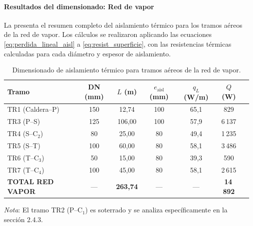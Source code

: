 \paragraph{Resultados del dimensionado: Red de vapor}
\label{par:resultados_vapor_aereo}

La  presenta el resumen completo del aislamiento térmico para los tramos aéreos de la red de vapor. Los cálculos se realizaron aplicando las ecuaciones \eqref{eq:perdida_lineal_aisl} a \eqref{eq:resist_superficie}, con las resistencias térmicas calculadas para cada diámetro y espesor de aislamiento.

\begin{table}[htbp]
	\centering
	\caption{Dimensionado de aislamiento térmico para tramos aéreos de la red de vapor.}
	\label{tab:aislamiento_vapor_aereo}
	\begin{tabular}{lcccccc}
		\toprule
		\textbf{Tramo}           & \textbf{DN (mm)} & \textbf{$L$ (m)}  & \textbf{$e_{\text{aisl}}$ (mm)} & \textbf{$q_L$ (W/m)} & \textbf{$Q$ (W)} \\
		\midrule
		TR1 (Caldera--P)         & 150              & 12{,}74           & 100                             & 65{,}1               & 829              \\
		TR3 (P--S)               & 125              & 106{,}00          & 100                             & 57{,}9               & 6\,137           \\
		TR4 (S--C$_2$)           & 80               & 25{,}00           & 80                              & 49{,}4               & 1\,235           \\
		TR5 (S--T)               & 100              & 60{,}00           & 80                              & 58{,}1               & 3\,486           \\
		TR6 (T--C$_3$)           & 50               & 15{,}00           & 80                              & 39{,}3               & 590              \\
		TR7 (T--C$_4$)           & 100              & 45{,}00           & 80                              & 58{,}1               & 2\,615           \\
		\midrule
		\textbf{TOTAL RED VAPOR} & ---              & \textbf{263{,}74} & ---                             & ---                  & \textbf{14\,892} \\
		\bottomrule
	\end{tabular}
	\vspace{0.3cm}

	\noindent \small \textit{Nota}: El tramo TR2 (P--C$_1$) es soterrado y se analiza específicamente en la sección 2.4.3.
\end{table}

